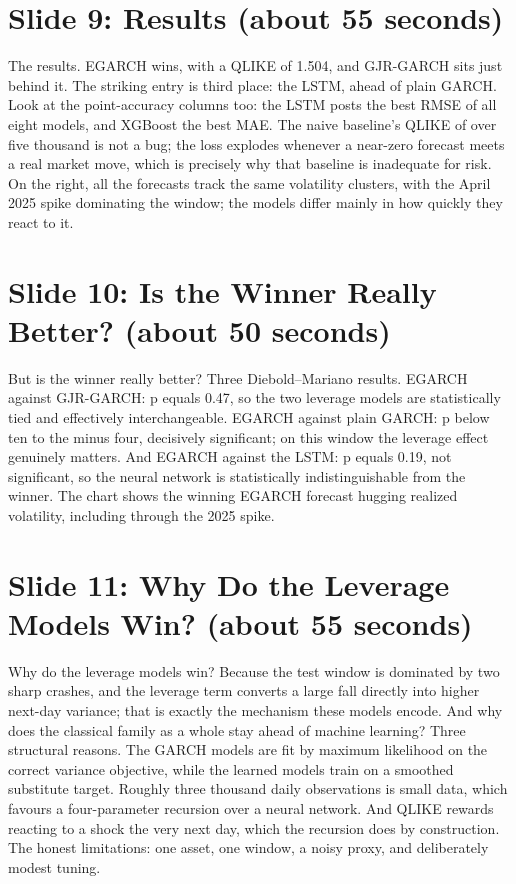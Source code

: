 \documentclass[a4paper,11pt]{article}
\begin{document}
\section*{Slide 9: Results (about 55 seconds)}

The results. EGARCH wins, with a QLIKE of 1.504, and GJR-GARCH sits just behind it. The striking entry is third place: the LSTM, ahead of plain GARCH. Look at the point-accuracy columns too: the LSTM posts the best RMSE of all eight models, and XGBoost the best MAE. The naive baseline's QLIKE of over five thousand is not a bug; the loss explodes whenever a near-zero forecast meets a real market move, which is precisely why that baseline is inadequate for risk. On the right, all the forecasts track the same volatility clusters, with the April 2025 spike dominating the window; the models differ mainly in how quickly they react to it.

\section*{Slide 10: Is the Winner Really Better? (about 50 seconds)}

But is the winner really better? Three Diebold–Mariano results. EGARCH against GJR-GARCH: p equals 0.47, so the two leverage models are statistically tied and effectively interchangeable. EGARCH against plain GARCH: p below ten to the minus four, decisively significant; on this window the leverage effect genuinely matters. And EGARCH against the LSTM: p equals 0.19, not significant, so the neural network is statistically indistinguishable from the winner. The chart shows the winning EGARCH forecast hugging realized volatility, including through the 2025 spike.

\section*{Slide 11: Why Do the Leverage Models Win? (about 55 seconds)}

Why do the leverage models win? Because the test window is dominated by two sharp crashes, and the leverage term converts a large fall directly into higher next-day variance; that is exactly the mechanism these models encode. And why does the classical family as a whole stay ahead of machine learning? Three structural reasons. The GARCH models are fit by maximum likelihood on the correct variance objective, while the learned models train on a smoothed substitute target. Roughly three thousand daily observations is small data, which favours a four-parameter recursion over a neural network. And QLIKE rewards reacting to a shock the very next day, which the recursion does by construction. The honest limitations: one asset, one window, a noisy proxy, and deliberately modest tuning.
\end{document}
